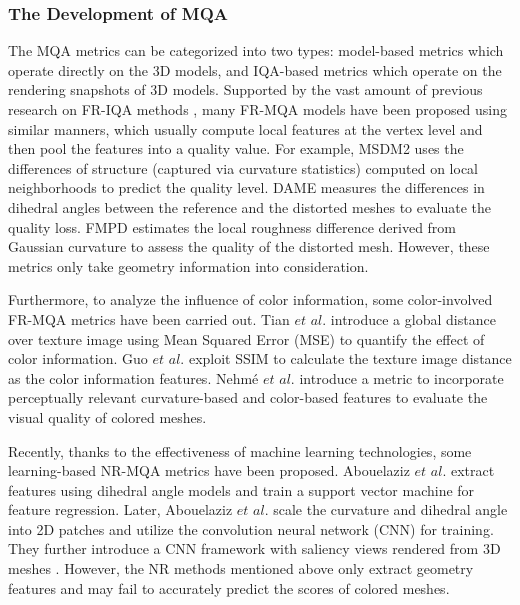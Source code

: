 \documentclass[lettersize,journal]{IEEEtran}
\begin{document}
\subsubsection{The Development of MQA}
The MQA metrics can be categorized into two types: model-based metrics \cite{m1} \cite{ff2_roughness} \cite{dame} \cite{nr-svr} \cite{nr-cnn} which operate directly on the 3D models, and IQA-based metrics \cite{tian-color} \cite{guo-color} \cite{nr-cnncmp} \cite{2d1} \cite{2d2} which operate on the rendering snapshots of 3D models.
Supported by the vast amount of previous research on FR-IQA methods \cite{ms-ssim,fsim,vif}, many FR-MQA models have been proposed using similar manners, which usually compute local features at the vertex level and then pool the features into a quality value. For example, MSDM2 \cite{m1} uses the differences of structure (captured via curvature statistics) computed on local neighborhoods to predict the quality level. DAME \cite{dame} measures the differences in dihedral angles between the reference and the distorted meshes to evaluate the quality loss. FMPD \cite{ff2_roughness} estimates the local roughness difference derived from Gaussian curvature to assess the quality of the distorted mesh. However, these metrics only take geometry information into consideration.

Furthermore, to analyze the influence of color information, some color-involved FR-MQA metrics have been carried out. Tian $et$ $al.$ \cite{tian-color} introduce a global distance over texture image using Mean Squared Error (MSE) to quantify the effect of color information. Guo $et$ $al.$ \cite{guo-color} exploit SSIM to calculate the texture image distance as the color information features. Nehmé $et$ $al.$ \cite{database} introduce a metric to incorporate perceptually relevant curvature-based and color-based features to evaluate the visual quality of colored meshes.

Recently, thanks to the effectiveness of machine learning technologies, some learning-based NR-MQA metrics have been proposed. Abouelaziz $et$ $al.$ \cite{nr-svr} extract features using dihedral angle models and train a support vector machine for feature regression. Later, Abouelaziz $et$ $al.$ \cite{nr-cnn} scale the curvature and dihedral angle into 2D patches and utilize the convolution neural network (CNN) for training. They further introduce a CNN framework with saliency views rendered from 3D meshes \cite{nr-cnncmp}. However, the NR methods mentioned above only extract geometry features and may fail to accurately predict the scores of colored meshes.
\end{document}

